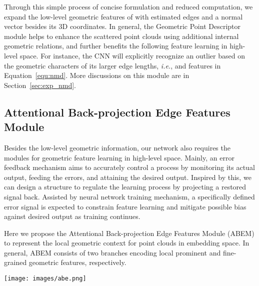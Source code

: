 \documentclass[journal,twoside]{IEEEtran}
\newcommand{\latinphrase}[1]{\textit{#1}}
\newcommand{\ie}{\latinphrase{i.e.}\xspace}
\begin{document}
Through this simple process of concise formulation and reduced computation, we expand the low-level geometric features of  with estimated edges and a normal vector besides its 3D coordinates. In general, the Geometric Point Descriptor module helps to enhance the scattered point clouds using additional internal geometric relations, and further benefits the following feature learning in high-level space. For instance, the CNN will explicitly recognize an outlier based on the geometric characters of its larger edge lengths, \ie,  and  features in Equation~\ref{equ:nmd}. More discussions on this module are in Section~\ref{sec:exp_nmd}.

\subsection{Attentional Back-projection Edge Features Module}
\label{sec:abef}
Besides the low-level geometric information, our network also requires the modules for geometric feature learning in high-level space. Mainly, an error feedback mechanism aims to accurately control a process by monitoring its actual output, feeding the errors, and attaining the desired output. Inspired by this, we can design a structure to regulate the learning process by projecting a restored signal back. Assisted by neural network training mechanism, a specifically defined error signal is expected to constrain feature learning and mitigate possible bias against desired output as training continues.

Here we propose the Attentional Back-projection Edge Features Module (ABEM) to represent the local geometric context for point clouds in embedding space. In general, ABEM consists of two branches encoding local prominent and fine-grained geometric features, respectively.
\begin{figure*}
\begin{center}
\texttt{[image: images/abe.png]}
\end{center}
   \caption{Attentional Back-projection Edge Features Module (ABEM) learns local geometric features in high-level spaces from two branches: one extracts prominent local context, while the other aggregates fine-grained information as a complement. We take the concatenated outputs to form the final feature representations of the point clouds and only pass the prominent features for the next layer of learning. (\emph{Note}: The ABEM works in a forward manner as introduced in Section~\ref{sec:abef}.)}
\label{fig:abem}
\end{figure*}
\end{document}
